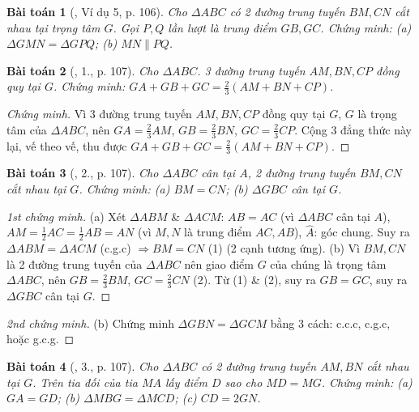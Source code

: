 \documentclass{article}
\newtheorem{baitoan}{Bài toán}
\begin{document}
\begin{baitoan}[\cite{SGK_Toan_7_Canh_Dieu_tap_2}, Ví dụ 5, p. 106]
	Cho $\Delta ABC$ có 2 đường trung tuyến $BM,CN$ cắt nhau tại trọng tâm $G$. Gọi $P,Q$ lần lượt là trung điểm $GB,GC$. Chứng minh: (a) $\Delta GMN = \Delta GPQ$; (b) $MN\parallel PQ$.
\end{baitoan}

\begin{baitoan}[\cite{SGK_Toan_7_Canh_Dieu_tap_2}, 1., p. 107]
	Cho $\Delta ABC$. 3 đường trung tuyến $AM,BN,CP$ đồng quy tại $G$. Chứng minh: $GA + GB + GC = \frac{2}{3}(AM + BN + CP)$.
\end{baitoan}

\begin{proof}[Chứng minh]
	Vì 3 đường trung tuyến $AM,BN,CP$ đồng quy tại $G$, $G$ là trọng tâm của $\Delta ABC$, nên $GA = \frac{2}{3}AM$, $GB = \frac{2}{3}BN$, $GC = \frac{2}{3}CP$. Cộng 3 đẳng thức này lại, vế theo vế, thu được $GA + GB + GC = \frac{2}{3}(AM + BN + CP)$.
\end{proof}

\begin{baitoan}[\cite{SGK_Toan_7_Canh_Dieu_tap_2}, 2., p. 107]
	Cho $\Delta ABC$ cân tại $A$, 2 đường trung tuyến $BM,CN$ cắt nhau tại $G$. Chứng minh: (a) $BM = CN$; (b) $\Delta GBC$ cân tại $G$.
\end{baitoan}

\begin{proof}[1st chứng minh]
	(a) Xét $\Delta ABM$ \& $\Delta ACM$: $AB = AC$ (vì $\Delta ABC$ cân tại $A$), $AM = \frac{1}{2}AC = \frac{1}{2}AB = AN$ (vì $M,N$ là trung điểm $AC,AB$), $\widehat{A}$: góc chung. Suy ra $\Delta ABM = \Delta ACM$ (c.g.c) $\Rightarrow BM = CN$ (1) (2 cạnh tương ứng). (b) Vì $BM,CN$ là 2 đường trung tuyến của $\Delta ABC$ nên giao điểm $G$ của chúng là trọng tâm $\Delta ABC$, nên $GB = \frac{2}{3}BM$, $GC = \frac{2}{3}CN$ (2). Từ (1) \& (2), suy ra $GB = GC$, suy ra $\Delta GBC$ cân tại $G$. 
\end{proof}

\begin{proof}[2nd chứng minh]
	(b) Chứng minh $\Delta GBN = \Delta GCM$ bằng 3 cách: c.c.c, c.g.c, hoặc g.c.g.
\end{proof}

\begin{baitoan}[\cite{SGK_Toan_7_Canh_Dieu_tap_2}, 3., p. 107]
	Cho $\Delta ABC$ có 2 đường trung tuyến $AM,BN$ cắt nhau tại $G$. Trên tia đối của tia $MA$ lấy điểm $D$ sao cho $MD = MG$. Chứng minh: (a) $GA = GD$; (b) $\Delta MBG = \Delta MCD$; (c) $CD = 2GN$.
\end{baitoan}
\end{document}
